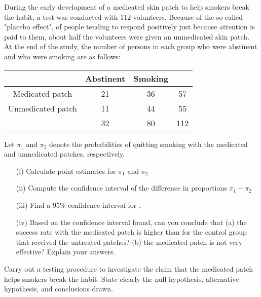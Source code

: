 
\item 
 During the early development of a medicated skin patch to help smokers break the habit, a test was conducted with 112 volunteers.  Because of the so-called
 "placebo effect", of people tending to respond positively just because attention is paid to them, about half the volunteers were given an unmedicated skin patch.  At the end of the study, the number of persons in each group who were abstinent and who were smoking are as follows:
 
 \begin{center}
 \begin{tabular}{|c|c|c|c|}
 \hline
 	&     Abstinent  &        Smoking   &     \\ \hline
 	
 	Medicated patch    &      21         &            36   &            57\\ \hline 
 	
 	Unmedicated patch  &       11       &              44   &            55\\ \hline 
 	
 	&       32       &              80    &          112\\ \hline
 \end{tabular} 
 \end{center}
 
 Let $\pi_1$ and $\pi_2$ denote the probabilities of quitting smoking with the medicated and unmedicated patches, respectively.
 
 \begin{itemize}
 	\item[(i)] Calculate point estimates for $\pi_1$ and $\pi_2$ 
 	
 	\item[(ii)] Compute the confidence interval of the difference in proportions $\pi_1 - \pi_2$ 
 	
 	\item[(iii)]Find a 95\% confidence interval for  .
 	\item[(iv)]  Based on the confidence interval found, can you conclude that (a) the success rate with the medicated patch is higher than for the control group that received the untreated patches?  (b) the medicated patch is not very effective?  Explain your answers.
 \end{itemize}

 
 Carry out a testing procedure to investigate the claim that the medicated patch helps smokers break the habit.  State clearly the null hypothesis, alternative hypothesis, and conclusions drawn.

